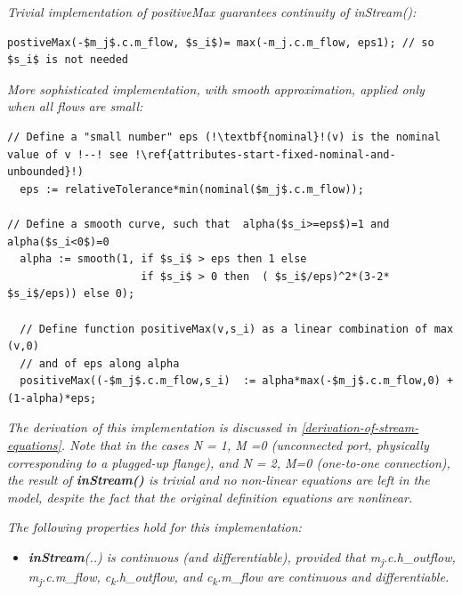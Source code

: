 \documentclass[10pt,a4paper]{report}
\begin{document}
\emph{Trivial implementation of positiveMax guarantees continuity of
inStream():}
\begin{lstlisting}[language=modelica,mathescape=true]
postiveMax(-$m_j$.c.m_flow, $s_i$)= max(-m_j.c.m_flow, eps1); // so $s_i$ is not needed
\end{lstlisting}
\emph{More sophisticated implementation, with smooth approximation,
applied only when {all} flows are small:}
\begin{lstlisting}[language=modelica,escapechar=!,mathescape=true]
// Define a "small number" eps (!\textbf{nominal}!(v) is the nominal value of v !--! see !\ref{attributes-start-fixed-nominal-and-unbounded}!)
  eps := relativeTolerance*min(nominal($m_j$.c.m_flow));
  
// Define a smooth curve, such that  alpha($s_i>=eps$)=1 and alpha($s_i<0$)=0
  alpha := smooth(1, if $s_i$ > eps then 1 else
                     if $s_i$ > 0 then  ( $s_i$/eps)^2*(3-2* $s_i$/eps)) else 0);
    
  // Define function positiveMax(v,s_i) as a linear combination of max (v,0)
  // and of eps along alpha
  positiveMax((-$m_j$.c.m_flow,s_i)  := alpha*max(-$m_j$.c.m_flow,0) +  (1-alpha)*eps;
\end{lstlisting}


\emph{The derivation of this implementation is discussed in}
\emph{\ref{derivation-of-stream-equations}. Note that in the cases N = 1, M =0 (unconnected port,
physically corresponding to a plugged-up flange), and N = 2, M=0
(one-to-one connection), the result of \textbf{inStream()} is trivial
and no non-linear equations are left in the model, despite the fact that
the original definition equations are nonlinear.}

\emph{The following properties hold for this implementation:}

\begin{itemize}
\item
  \emph{\textbf{inStream}(..) is continuous (and differentiable),
  provided that m\textsubscript{j}.c.h}\_\emph{outflow,
  m\textsubscript{j}.c.m}\_\emph{flow,
  c\textsubscript{k}.h}\_\emph{outflow, and
  c\textsubscript{k}.m}\_\emph{flow are continuous and differentiable.}
\end{itemize}
\end{document}
